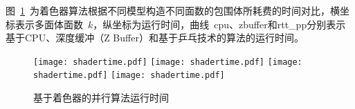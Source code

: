 图~\ref{fig:chart:exps:shadertime}~为着色器算法根据不同模型构造不同面数的包围体所耗费的时间对比，横坐标表示多面体面数~$k$，纵坐标为运行时间，曲线~cpu、zbuffer和rtt\_pp分别表示基于CPU、深度缓冲（Z Buffer）和基于乒乓技术的算法的运行时间。

\begin{figure}[htbp] %
\centering
{}
{  
   \texttt{[image: shadertime.pdf]}
}
{  
    \texttt{[image: shadertime.pdf]}
}\linebreak %
{  
   \texttt{[image: shadertime.pdf]}
}
{  
   \texttt{[image: shadertime.pdf]}
}
\caption{基于着色器的并行算法运行时间}
\label{fig:chart:exps:shadertime}
\end{figure}

